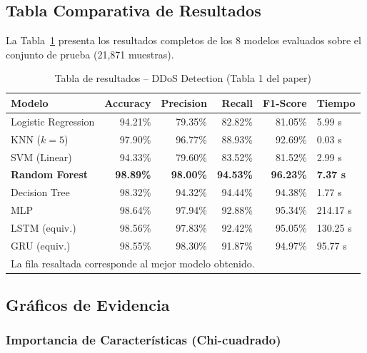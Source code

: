 \documentclass[12pt,a4paper]{article}
\begin{document}
\subsection{Tabla Comparativa de Resultados}

La Tabla~\ref{tab:resultados} presenta los resultados completos de los 8 modelos evaluados
sobre el conjunto de prueba (21{,}871 muestras).

\begin{table}[H]
\centering
\caption{Tabla de resultados -- DDoS Detection (Tabla 1 del paper)}
\label{tab:resultados}
\begin{tabular}{lrrrrl}
\toprule
\textbf{Modelo} & \textbf{Accuracy} & \textbf{Precision} & \textbf{Recall} & \textbf{F1-Score} & \textbf{Tiempo} \\
\midrule
Logistic Regression      & 94.21\% & 79.35\% & 82.82\% & 81.05\% &   5.99 s \\
KNN ($k=5$)              & 97.90\% & 96.77\% & 88.93\% & 92.69\% &   0.03 s \\
SVM (Linear)             & 94.33\% & 79.60\% & 83.52\% & 81.52\% &   2.99 s \\
\rowcolor{green!15}
\textbf{Random Forest}   & \textbf{98.89\%} & \textbf{98.00\%} & \textbf{94.53\%} & \textbf{96.23\%} & \textbf{7.37 s} \\
Decision Tree            & 98.32\% & 94.32\% & 94.44\% & 94.38\% &   1.77 s \\
MLP                      & 98.64\% & 97.94\% & 92.88\% & 95.34\% & 214.17 s \\
LSTM (equiv.)            & 98.56\% & 97.83\% & 92.42\% & 95.05\% & 130.25 s \\
GRU (equiv.)             & 98.55\% & 98.30\% & 91.87\% & 94.97\% &  95.77 s \\
\bottomrule
\multicolumn{6}{l}{\small La fila resaltada corresponde al mejor modelo obtenido.}
\end{tabular}
\end{table}

\subsection{Gráficos de Evidencia}

\subsubsection{Importancia de Características (Chi-cuadrado)}
\end{document}

